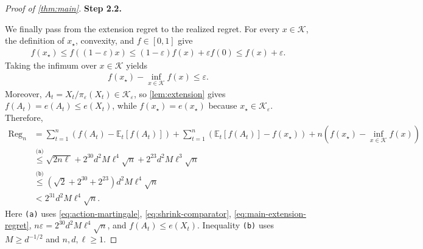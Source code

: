 \documentclass[11pt]{article}
\newcommand{\proofstepinline}[1]{%
    {\sffamily\bfseries\color{blue!55!black}Step #1.}\enspace
}
\newcommand{\reason}[1]{\texttt{(#1)}}
\newcommand{\explan}[2]{\stackrel{\reason{#2}}{#1}}
\newcommand{\E}{\mathbb E}
\newcommand{\K}{\mathcal K}
\newcommand{\1}{\mathbf 1}
\newcommand{\eps}{\varepsilon}
\begin{document}
\begin{proof}[Proof of \cref{thm:main}]
    \proofstepinline{2.2}
    We finally pass from the extension regret to the realized regret.
    For every $x\in\K$, the definition of $x_\star$, convexity, and
    $f\in[0,1]$ give
    \begin{align}
        f(x_\star)
        \leq f((1-\eps)x)
        \leq(1-\eps)f(x)+\eps f(0)
        \leq f(x)+\eps.
    \end{align}
    Taking the infimum over $x\in\K$ yields
    \begin{align}
        f(x_\star)-\inf_{x\in\K}f(x)\leq\eps.
        \label{eq:shrink-comparator}
    \end{align}
    Moreover, $A_t=X_t/\pi_\eps(X_t)\in\K_\eps$, so
    \cref{lem:extension} gives $f(A_t)=e(A_t)\leq e(X_t)$, while
    $f(x_\star)=e(x_\star)$ because $x_\star\in\K_\eps$.
    Therefore,
    \begin{align}
        \operatorname{Reg}_n
         & =
        \sum_{t=1}^n
        \left(f(A_t)-\E_t[f(A_t)]\right)
        +\sum_{t=1}^n
        \left(\E_t[f(A_t)]-f(x_\star)\right)
        +n\left(f(x_\star)-\inf_{x\in\K}f(x)\right)
        \nonumber           \\
         & \explan{\leq}{a}
        \sqrt{2n\ell}
        +2^{30}d^2M\ell^4\sqrt n
        +2^{23}d^2M\ell^3\sqrt n
        \nonumber           \\
         & \explan{\leq}{b}
        \left(
        \sqrt2+2^{30}+2^{23}
        \right)d^2M\ell^4\sqrt n
        \nonumber           \\
         & <
        2^{31}d^2M\ell^4\sqrt n.
    \end{align}
    Here \reason{a} uses \eqref{eq:action-martingale},
    \eqref{eq:shrink-comparator}, \eqref{eq:main-extension-regret},
    $n\eps=2^{30}d^2M\ell^4\sqrt n$, and
    $f(A_t)\leq e(X_t)$.
    Inequality \reason{b} uses
    $M\geq d^{-1/2}$ and $n,d,\ell\geq1$.
\end{proof}
\end{document}
